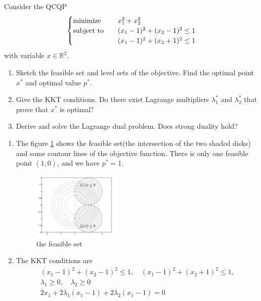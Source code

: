 \begin{problem}[5.26]
    Consider the QCQP\[\begin{cases}
        \operatorname{minimize}\quad &x_1^2 + x_2^2\\
        \operatorname{subject\ to}\quad &(x_1 - 1)^2 + (x_2 - 1)^2 \le 1\\
        &(x_1 - 1)^2 + (x_2 + 1)^2 \le 1
    \end{cases}\] with variable $x \in \mathbb{R}^2$.
    \begin{enumerate}
        \item Sketch the feasible set and level sets of the objective. Find the optimal point $x^*$ and optimal value $p^*$.
        \item Give the KKT conditions. Do there exist Lagrange multipliers $\lambda_1^*$ and $\lambda_2^*$ that prove that $x^*$ is optimal?
        \item Derive and solve the Lagrange dual problem. Does strong duality hold?
    \end{enumerate}
    \Answer \text{}\begin{enumerate}
        \item The figure \ref{fig2} shows the feasible set(the intersection of the two shaded disks) and some contour lines of the objective function. There is only one feasible point $(1,0)$, and we have $p^* = 1$.\begin{figure}[htbp]
            \centering
            \includegraphics[width=0.4\textwidth]{./figure/fig2.png}
            \caption{the feasible set \label{fig2}}
          \end{figure}
          \item The KKT conditions are\[\begin{array}{c}
            \left(x_{1}-1\right)^{2}+\left(x_{2}-1\right)^{2} \leq 1, \quad\left(x_{1}-1\right)^{2}+\left(x_{2}+1\right)^{2} \leq 1, \\
            \lambda_{1} \geq 0, \quad \lambda_{2} \geq 0 \\
            2 x_{1}+2 \lambda_{1}\left(x_{1}-1\right)+2 \lambda_{2}\left(x_{1}-1\right)=0 \\

\end{array}\]
\end{enumerate}
\end{problem}

